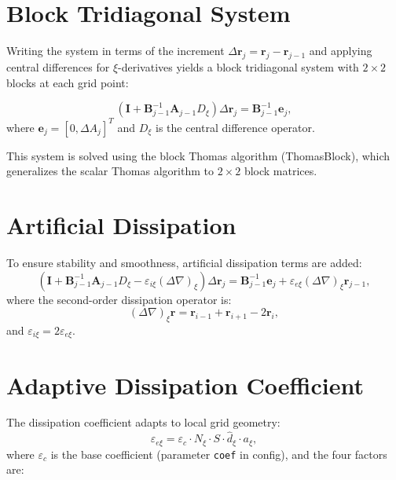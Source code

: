 \documentclass[11pt,a4paper]{report}
\newcommand{\rvec}{\bm{r}}
\begin{document}
\section{Block Tridiagonal System}

Writing the system in terms of the increment $\Delta \rvec_j = \rvec_j - \rvec_{j-1}$ and applying central differences for $\xi$-derivatives yields a block tridiagonal system with $2 \times 2$ blocks at each grid point:

\begin{equation}
    (\bm{I} + \bm{B}_{j-1}^{-1} \bm{A}_{j-1} D_\xi) \Delta \rvec_j = \bm{B}_{j-1}^{-1} \bm{e}_j,
\end{equation}
where $\bm{e}_j = [0, \Delta A_j]^T$ and $D_\xi$ is the central difference operator.

This system is solved using the block Thomas algorithm (ThomasBlock), which generalizes the scalar Thomas algorithm to $2 \times 2$ block matrices.

\section{Artificial Dissipation}

To ensure stability and smoothness, artificial dissipation terms are added:
\begin{equation}
    (\bm{I} + \bm{B}_{j-1}^{-1} \bm{A}_{j-1} D_\xi - \varepsilon_{i\xi} (\Delta \nabla)_\xi) \Delta \rvec_j = \bm{B}_{j-1}^{-1} \bm{e}_j + \varepsilon_{e\xi} (\Delta \nabla)_\xi \rvec_{j-1},
    \label{eq:hyper-dissipation}
\end{equation}
where the second-order dissipation operator is:
\begin{equation}
    (\Delta \nabla)_\xi \rvec = \rvec_{i-1} + \rvec_{i+1} - 2\rvec_i,
\end{equation}
and $\varepsilon_{i\xi} = 2 \varepsilon_{e\xi}$.

\section{Adaptive Dissipation Coefficient}

The dissipation coefficient adapts to local grid geometry:
\begin{equation}
    \varepsilon_{e\xi} = \varepsilon_c \cdot N_\xi \cdot S \cdot \hat{d}_\xi \cdot a_\xi,
\end{equation}
where $\varepsilon_c$ is the base coefficient (parameter \texttt{coef} in config), and the four factors are:
\end{document}
